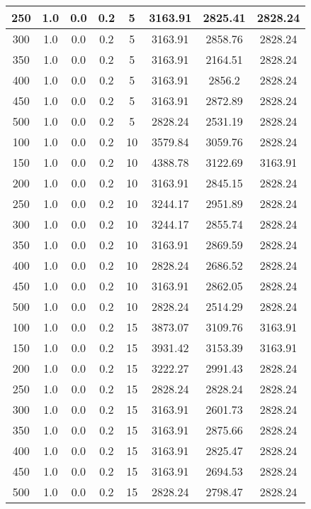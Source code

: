 \documentclass[a4paper, 12pt]{extreport}
\begin{document}
\begin{itemize}
\begin{longtable}{|c|c|c|c|c|c|c|c|}
			250 & 1.0 & 0.0 & 0.2 & 5 & 3163.91 & 2825.41 & 2828.24 \\\hline
			300 & 1.0 & 0.0 & 0.2 & 5 & 3163.91 & 2858.76 & 2828.24 \\\hline
			350 & 1.0 & 0.0 & 0.2 & 5 & 3163.91 & 2164.51 & 2828.24 \\\hline
			400 & 1.0 & 0.0 & 0.2 & 5 & 3163.91 & 2856.2 & 2828.24 \\\hline
			450 & 1.0 & 0.0 & 0.2 & 5 & 3163.91 & 2872.89 & 2828.24 \\\hline
			500 & 1.0 & 0.0 & 0.2 & 5 & 2828.24 & 2531.19 & 2828.24 \\\hline
			100 & 1.0 & 0.0 & 0.2 & 10 & 3579.84 & 3059.76 & 2828.24 \\\hline
			150 & 1.0 & 0.0 & 0.2 & 10 & 4388.78 & 3122.69 & 3163.91 \\\hline
			200 & 1.0 & 0.0 & 0.2 & 10 & 3163.91 & 2845.15 & 2828.24 \\\hline
			250 & 1.0 & 0.0 & 0.2 & 10 & 3244.17 & 2951.89 & 2828.24 \\\hline
			300 & 1.0 & 0.0 & 0.2 & 10 & 3244.17 & 2855.74 & 2828.24 \\\hline
			350 & 1.0 & 0.0 & 0.2 & 10 & 3163.91 & 2869.59 & 2828.24 \\\hline
			400 & 1.0 & 0.0 & 0.2 & 10 & 2828.24 & 2686.52 & 2828.24 \\\hline
			450 & 1.0 & 0.0 & 0.2 & 10 & 3163.91 & 2862.05 & 2828.24 \\\hline
			500 & 1.0 & 0.0 & 0.2 & 10 & 2828.24 & 2514.29 & 2828.24 \\\hline
			100 & 1.0 & 0.0 & 0.2 & 15 & 3873.07 & 3109.76 & 3163.91 \\\hline
			150 & 1.0 & 0.0 & 0.2 & 15 & 3931.42 & 3153.39 & 3163.91 \\\hline
			200 & 1.0 & 0.0 & 0.2 & 15 & 3222.27 & 2991.43 & 2828.24 \\\hline
			250 & 1.0 & 0.0 & 0.2 & 15 & 2828.24 & 2828.24 & 2828.24 \\\hline
			300 & 1.0 & 0.0 & 0.2 & 15 & 3163.91 & 2601.73 & 2828.24 \\\hline
			350 & 1.0 & 0.0 & 0.2 & 15 & 3163.91 & 2875.66 & 2828.24 \\\hline
			400 & 1.0 & 0.0 & 0.2 & 15 & 3163.91 & 2825.47 & 2828.24 \\\hline
			450 & 1.0 & 0.0 & 0.2 & 15 & 3163.91 & 2694.53 & 2828.24 \\\hline
			500 & 1.0 & 0.0 & 0.2 & 15 & 2828.24 & 2798.47 & 2828.24 \\\hline

\end{longtable}
\end{itemize}
\end{document}
